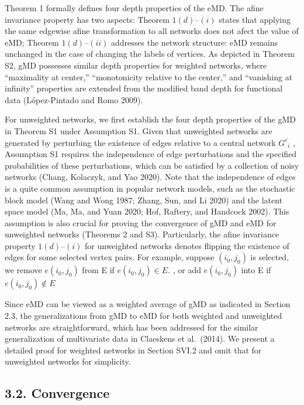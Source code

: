 \documentclass[
  10
]{article}
\begin{document}
Theorem 1 formally defines four depth properties of the eMD. The afine
invariance property has two aspects: Theorem \(1 ( d ) – ( i )\) states
that applying the same edgewise afine transformation to all networks
does not afect the value of eMD; Theorem \(1 ( d ) – ( i i )\) addresses
the network structure: eMD remains unchanged in the case of changing the
labels of vertices. As depicted in Theorem S2, gMD possesses similar
depth properties for weighted networks, where ``maximality at center,''
``monotonicity relative to the center,'' and ``vanishing at infinity''
properties are extended from the modified band depth for functional data
(López-Pintado and Romo 2009).

For unweighted networks, we first establish the four depth properties of
the gMD in Theorem S1 under Assumption S1. Given that unweighted
networks are generated by perturbing the existence of edges relative to
a central network \(G ^ { c } { } _ { i }\) , Assumption S1 requires the
independence of edge perturbations and the specified probabilities of
these perturbations, which can be satisfied by a collection of noisy
networks (Chang, Kolaczyk, and Yao 2020). Note that the independence of
edges is a quite common assumption in popular network models, such as
the stochastic block model (Wang and Wong 1987; Zhang, Sun, and Li 2020)
and the latent space model (Ma, Ma, and Yuan 2020; Hof, Raftery, and
Handcock 2002). This assumption is also crucial for proving the
convergence of gMD and eMD for unweighted networks (Theorems 2 and S3).
Particularly, the afine invariance property \(1 ( d ) – ( i )\) for
unweighted networks denotes flipping the existence of edges for some
selected vertex pairs. For example, suppose
\(( i _ { 0 } , j _ { 0 } )\) is selected, we remove
\(e ( i _ { 0 } , j _ { 0 } )\) from E if
\(e ( i _ { 0 } , j _ { 0 } ) \in E .\) , or add
\(e ( i _ { 0 } , j _ { 0 } )\) into E if
\(e ( i _ { 0 } , j _ { 0 } ) \notin E\)

Since eMD can be viewed as a weighted average of gMD as indicated in
Section 2.3, the generalizations from gMD to eMD for both weighted and
unweighted networks are straightforward, which has been addressed for
the similar generalization of multivariate data in Claeskens et
al.~(2014). We present a detailed proof for weighted networks in Section
SVI.2 and omit that for unweighted networks for simplicity.

\subsection{3.2. Convergence}\label{convergence}
\end{document}
